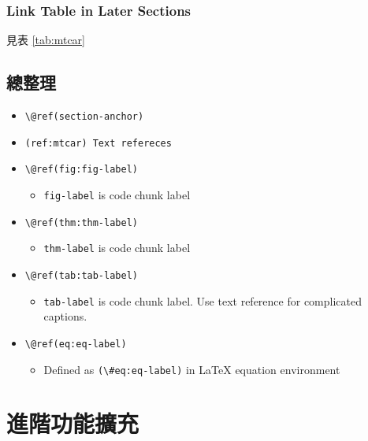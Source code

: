 \documentclass[oneside]{book}
\providecommand{\tightlist}{%
  \setlength{\itemsep}{0pt}\setlength{\parskip}{0pt}}
\theoremstyle{definition}
\theoremstyle{definition}
\theoremstyle{definition}
\theoremstyle{remark}
\begin{document}
\hypertarget{link-table-in-later-sections}{%
\subsection*{Link Table in Later Sections}\label{link-table-in-later-sections}}

見表 \ref{tab:mtcar}

\hypertarget{ux7e3dux6574ux7406}{%
\section{總整理}\label{ux7e3dux6574ux7406}}

\begin{itemize}
\tightlist
\item
  \texttt{\textbackslash{}@ref(section-anchor)}
\item
  \texttt{(ref:mtcar)\ Text\ refereces}
\item
  \texttt{\textbackslash{}@ref(fig:fig-label)}

  \begin{itemize}
  \tightlist
  \item
    \texttt{fig-label} is code chunk label
  \end{itemize}
\item
  \texttt{\textbackslash{}@ref(thm:thm-label)}

  \begin{itemize}
  \tightlist
  \item
    \texttt{thm-label} is code chunk label
  \end{itemize}
\item
  \texttt{\textbackslash{}@ref(tab:tab-label)}

  \begin{itemize}
  \tightlist
  \item
    \texttt{tab-label} is code chunk label. Use text reference for complicated captions.
  \end{itemize}
\item
  \texttt{\textbackslash{}@ref(eq:eq-label)}

  \begin{itemize}
  \tightlist
  \item
    Defined as \texttt{(\textbackslash{}\#eq:eq-label)} in LaTeX equation environment
  \end{itemize}
\end{itemize}

\hypertarget{add-on}{%
\chapter{進階功能擴充}\label{add-on}}
\end{document}
